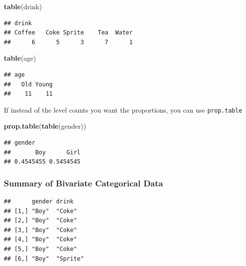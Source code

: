 \documentclass[]{book}
\newenvironment{Shaded}{\begin{snugshade}}{\end{snugshade}}
\newcommand{\KeywordTok}[1]{\textcolor[rgb]{0.13,0.29,0.53}{\textbf{{#1}}}}
\newcommand{\StringTok}[1]{\textcolor[rgb]{0.31,0.60,0.02}{{#1}}}
\newcommand{\CommentTok}[1]{\textcolor[rgb]{0.56,0.35,0.01}{\textit{{#1}}}}
\newcommand{\NormalTok}[1]{{#1}}
\theoremstyle{definition}
\theoremstyle{definition}
\theoremstyle{remark}
\begin{document}
\begin{Shaded}
\begin{Highlighting}[]
\KeywordTok{table}\NormalTok{(drink)}
\end{Highlighting}
\end{Shaded}

\begin{verbatim}
## drink
## Coffee   Coke Sprite    Tea  Water 
##      6      5      3      7      1
\end{verbatim}

\begin{Shaded}
\begin{Highlighting}[]
\KeywordTok{table}\NormalTok{(age)}
\end{Highlighting}
\end{Shaded}

\begin{verbatim}
## age
##   Old Young 
##    11    11
\end{verbatim}

If instead of the level counts you want the proportions, you can use
\texttt{prop.table}

\begin{Shaded}
\begin{Highlighting}[]
\KeywordTok{prop.table}\NormalTok{(}\KeywordTok{table}\NormalTok{(gender))}
\end{Highlighting}
\end{Shaded}

\begin{verbatim}
## gender
##       Boy      Girl 
## 0.4545455 0.5454545
\end{verbatim}

\subsubsection{Summary of Bivariate Categorical
Data}\label{summary-of-bivariate-categorical-data}

\begin{Shaded}
\end{Shaded}

\begin{verbatim}
##      gender drink   
## [1,] "Boy"  "Coke"  
## [2,] "Boy"  "Coke"  
## [3,] "Boy"  "Coke"  
## [4,] "Boy"  "Coke"  
## [5,] "Boy"  "Coke"  
## [6,] "Boy"  "Sprite"
\end{verbatim}
\end{document}
